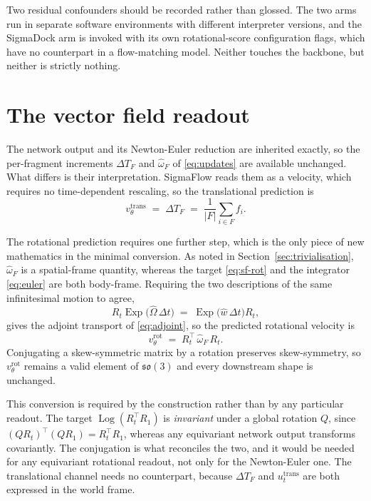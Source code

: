 \documentclass[11pt,a4paper]{report}
\theoremstyle{plain}
\theoremstyle{definition}
\theoremstyle{remark}
\newcommand{\sothree}{\mathfrak{so}(3)}
\newcommand{\Exp}{\operatorname{Exp}}
\newcommand{\Log}{\operatorname{Log}}
\newcommand{\vfield}{u}
\newcommand{\pred}{v_\theta}
\newcommand{\skewm}[1]{\widehat{#1}}
\newcommand{\Rot}{R}
\begin{document}
Two residual confounders should be recorded rather than glossed. The two arms
run in separate software environments with different interpreter versions, and
the SigmaDock arm is invoked with its own rotational-score configuration flags,
which have no counterpart in a flow-matching model. Neither touches the
backbone, but neither is strictly nothing.

\section{The vector field readout}
\label{sec:sf-readout}

The network output and its Newton-Euler reduction are inherited exactly, so the
per-fragment increments $\Delta T_F$ and $\skewm{\omega}_F$ of
\eqref{eq:updates} are available unchanged. What differs is their
interpretation. SigmaFlow reads them as a velocity, which requires no
time-dependent rescaling, so the translational prediction is
\begin{equation}
  \pred^{\mathrm{trans}} \;=\; \Delta T_F
  \;=\; \frac{1}{|F|}\sum_{i \in F} f_i .
  \label{eq:sf-trans-pred}
\end{equation}

The rotational prediction requires one further step, which is the only piece of
new mathematics in the minimal conversion. As noted in
Section~\ref{sec:trivialisation}, $\skewm{\omega}_F$ is a spatial-frame
quantity, whereas the target \eqref{eq:sf-rot} and the integrator
\eqref{eq:euler} are both body-frame. Requiring the two descriptions of the
same infinitesimal motion to agree,
\begin{equation}
  \Rot_t \Exp\!\bigl(\skewm{\Omega}\,\Delta t\bigr)
  \;=\; \Exp\!\bigl(\skewm{w}\,\Delta t\bigr) \Rot_t ,
\end{equation}
gives the adjoint transport of \eqref{eq:adjoint}, so the predicted rotational
velocity is
\begin{equation}
  \pred^{\mathrm{rot}}
  \;=\; \Rot_t^{\top}\, \skewm{\omega}_F\, \Rot_t .
  \label{eq:frame-conversion}
\end{equation}
Conjugating a skew-symmetric matrix by a rotation preserves skew-symmetry, so
$\pred^{\mathrm{rot}}$ remains a valid element of $\sothree$ and every
downstream shape is unchanged.

This conversion is required by the construction rather than by any particular
readout. The target $\Log(\Rot_t^\top \Rot_1)$ is \emph{invariant} under a
global rotation $Q$, since $(Q\Rot_t)^\top(Q\Rot_1) = \Rot_t^\top\Rot_1$,
whereas any equivariant network output transforms covariantly. The conjugation
is what reconciles the two, and it would be needed for any equivariant
rotational readout, not only for the Newton-Euler one. The translational
channel needs no counterpart, because $\Delta T_F$ and
$\vfield^{\mathrm{trans}}_t$ are both expressed in the world frame.
\end{document}
